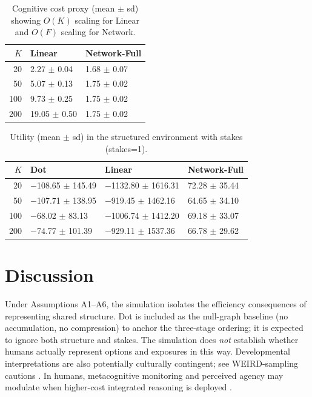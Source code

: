 \documentclass[11pt]{article}
\begin{document}
\begin{table}[t]
\caption{Cognitive cost proxy (mean $\pm$ sd) showing $O(K)$ scaling for Linear and $O(F)$ scaling for Network.}
\label{tab:cog_scaling}
\centering
\begin{tabular}{rll}
\toprule
$K$ & Linear & Network-Full \\
\midrule
20 & 2.27 $\pm$ 0.04 & 1.68 $\pm$ 0.07 \\
50 & 5.07 $\pm$ 0.13 & 1.75 $\pm$ 0.02 \\
100 & 9.73 $\pm$ 0.25 & 1.75 $\pm$ 0.02 \\
200 & 19.05 $\pm$ 0.50 & 1.75 $\pm$ 0.02 \\
\bottomrule
\end{tabular}
\end{table}

\begin{table}[t]
\caption{Utility (mean $\pm$ sd) in the structured environment with stakes (stakes=1).}
\label{tab:util_struct1}
\centering
\begin{tabular}{rlll}
\toprule
$K$ & Dot & Linear & Network-Full \\
\midrule
20 & $-$108.65 $\pm$ 145.49 & $-$1132.80 $\pm$ 1616.31 & 72.28 $\pm$ 35.44 \\
50 & $-$107.71 $\pm$ 138.95 & $-$919.45 $\pm$ 1462.16 & 64.65 $\pm$ 34.10 \\
100 & $-$68.02 $\pm$ 83.13 & $-$1006.74 $\pm$ 1412.20 & 69.18 $\pm$ 33.07 \\
200 & $-$74.77 $\pm$ 101.39 & $-$929.11 $\pm$ 1537.36 & 66.78 $\pm$ 29.62 \\
\bottomrule
\end{tabular}
\end{table}


\section{Discussion}



Under Assumptions A1--A6, the simulation isolates the efficiency consequences of
representing shared structure. Dot is included as the null-graph baseline (no
accumulation, no compression) to anchor the three-stage ordering; it is expected
to ignore both structure and stakes. The simulation does \emph{not} establish
whether humans actually represent options and exposures in this way.
Developmental interpretations are also potentially culturally contingent; see
WEIRD-sampling cautions \cite{Henrich2010}. In humans, metacognitive monitoring
and perceived agency may modulate when higher-cost integrated reasoning is
deployed \cite{Flavell1979,Bandura1997}.
\end{document}
